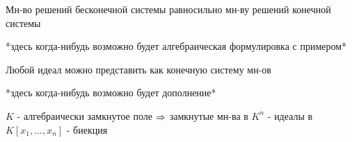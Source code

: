 \documentclass[geometry.tex]{subfiles}
\begin{document}
\begin{examples}
\begin{enumerate}
\begin{uutv}
\begin{enumerate}
              \begin{ttheorem}
                Мн-во решений бесконечной системы равносильно мн-ву решений конечной системы
              \end{ttheorem}
              *здесь когда-нибудь возможно будет алгебраическая формулировка с примером*
              \begin{ttheorem}[Гильберта]
                Любой идеал можно представить как конечную систему мн-ов
              \end{ttheorem}
              *здесь когда-нибудь возможно будет дополнение*
              \begin{ttheorem}
                $K$ - алгебраически замкнутое поле $\Rightarrow$ замкнутые мн-ва в $K^n$ - идеалы в $K[x_1,...,x_n]$ - биекция
              \end{ttheorem}
            \end{enumerate}
          \end{uutv}
      \end{enumerate}
  \end{examples}
\end{document}
